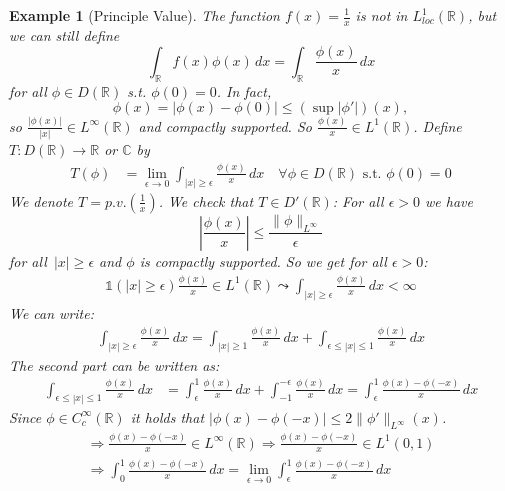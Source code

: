 \documentclass{report}
\theoremstyle{tommy}
\newtheorem{eg}[defn]{Example}
\begin{document}
  \begin{eg}[Principle Value]
    The function \(f(x) = \frac{1}{x}\) is not in \(L_{loc}^1(\mathbb{R})\), but we can still define
    \[\int_{\mathbb{R}} f(x) \phi(x) \, dx = \int_{\mathbb{R}} \frac{\phi(x)}{x} \, dx\] for all \(\phi \in D(\mathbb{R})\) s.t. \(\phi(0) = 0\). In fact, \[\phi(x) = |\phi(x)-\phi(0)| \le (\sup |\phi'|)(x),\] so \(\frac{|\phi(x)|}{|x|} \in L^\infty(\mathbb{R})\) and compactly supported. So \(\frac{\phi(x)}{x} \in L^1(\mathbb{R})\).
    Define \(T: D(\mathbb{R}) \to \mathbb{R}\) or \(\mathbb{C}\) by \begin{align*}
      T(\phi) 
      &= \lim_{\epsilon \to 0} \int_{|x| \ge \epsilon} \frac{\phi(x)}{x} \, dx \quad \forall \phi \in D(\mathbb{R}) \text{ s.t. } \phi(0) = 0
    \end{align*}
    We denote \(T = p.v. \left(\frac{1}{x}\right)\). We check that \(T \in D'(\mathbb{R})\): For all \(\epsilon > 0\) we have  \[\left|\frac{\phi(x)}{x}\right| \le \frac{\|\phi\|_{L^\infty}}{\epsilon}\] for all \(|x| \ge \epsilon\) and \(\phi\) is compactly supported. So we get for all \(\epsilon > 0\):
    \begin{align*}
      \mathbb{1}(|x| \ge \epsilon)\frac{\phi(x)}{x} \in L^1(\mathbb{R}) \leadsto \int_{|x| \ge \epsilon} \frac{\phi(x)}{x} \, dx < \infty
    \end{align*}
    We can write:
    \begin{align*}
      \int_{|x| \ge \epsilon} \frac{\phi(x)}{x} \, dx 
      = \int_{|x|\ge 1} \frac{\phi(x)}{x} \, dx + \int_{\epsilon \le |x|\le 1} \frac{\phi(x)}{x}\, dx
    \end{align*}
    The second part can be written as:
    \begin{align*}
      \int_{\epsilon \le |x| \le 1} \frac{\phi(x)}{x} \, dx
      &= \int_{\epsilon}^1 \frac{\phi(x)}{x} \, dx + \int_{-1}^{-\epsilon} \frac{\phi(x)}{x} \, dx 
      = \int_\epsilon^1 \frac{\phi(x) - \phi(-x)}{x}\, dx
    \end{align*}
    Since \(\phi \in C_c^\infty(\mathbb{R})\) it holds that \(|\phi(x) - \phi(-x)|  \le 2 \|\phi'\|_{L^\infty}(x)\).
    \begin{align*}
      \Rightarrow \frac{\phi(x) - \phi(-x)}{x} \in L^\infty(\mathbb{R})
      \Rightarrow \frac{\phi(x) - \phi(-x)}{x} \in L^1(0, 1) \\
      \Rightarrow \int_0^1 \frac{\phi(x) - \phi(-x)}{x} \, dx = \lim_{\epsilon \to 0} \int_\epsilon^1 \frac{\phi(x) - \phi(-x)}{x} \, dx
    \end{align*}
  \end{eg}
\end{document}
